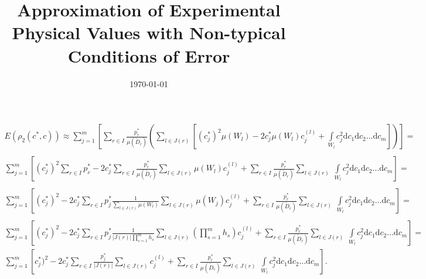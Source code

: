 \documentclass[a4paper]{article}
\title{Approximation of Experimental Physical Values with Non-typical Conditions of Error}
\date{\today}
\numberwithin{equation}{subsection}
\begin{document}
\begin{gather}
\nonumber
E(\rho_{2}(c^{*},c)) \approx \sum\limits_{j=1}^{m}  \left[ \sum\limits_{r \in I} \frac{p_{r}^{*}}{\mu(\tilde{D}_{r})} \left( \sum\limits_{l \in J(r)} \left[ (c_{j}^{*})^{2} \mu(W_{l}) - 2c_{j}^{*} \mu(W_{l}) c_{j}^{(l)} + \int\limits_{W_{l}} c_{j}^{2} \mathrm{d}c_{1} \mathrm{d}c_{2} \dots \mathrm{d}c_{m} \right] \right) \right] = \\
\nonumber
\\
\nonumber
\sum\limits_{j=1}^{m} \left[  (c_{j}^{*})^{2}  \sum\limits_{r \in I} p_{r}^{*}  - 2c_{j}^{*}  \sum\limits_{r \in I} \frac{p_{r}^{*}}{\mu(\tilde{D}_{r})} \sum\limits_{l \in J(r)} \mu(W_{l})  c_{j}^{(l)}  + \sum\limits_{r \in I} \frac{p_{r}^{*}}{\mu(\tilde{D}_{r})} \sum\limits_{l \in J(r)} \ \int\limits_{W_{l}} c_{j}^{2}  \mathrm{d}c_{1} \mathrm{d}c_{2} \dots \mathrm{d}c_{m} \right] = \\
\nonumber
\\
\nonumber
\sum\limits_{j=1}^{m} \left[  (c_{j}^{*})^{2} - 2c_{j}^{*} \sum\limits_{r \in I} p_{j}^{*} \frac{1}{\sum\limits_{l \in J(r)} \mu(W_{l})} \sum\limits_{l \in J(r)} \mu(W_{j}) c_{j}^{(l)} +  \sum\limits_{r \in I} \frac{p_{r}^{*}}{\mu(\tilde{D}_{r})} \sum\limits_{l \in J(r)} \ \int\limits_{W_{l}} c_{j}^{2}  \mathrm{d}c_{1} \mathrm{d}c_{2} \dots \mathrm{d}c_{m} \right] = \\
\nonumber
\\
\nonumber
\sum\limits_{j=1}^{m}  \left[    (c_{j}^{*})^{2} - 2c_{j}^{*} \sum\limits_{r \in I} p_{j}^{*} \frac{1}{\left| J(r) \right| \prod\limits_{s=1}^{m} h_{s}} \sum\limits_{l \in J(r)} \left( \prod_{s=1}^{m} h_{s} \right) c_{j}^{(l)} +  \sum\limits_{r \in I} \frac{p_{r}^{*}}{\mu(\tilde{D}_{r})} \sum\limits_{l \in J(r)} \ \int\limits_{W_{l}} c_{j}^{2}  \mathrm{d}c_{1} \mathrm{d}c_{2} \dots \mathrm{d}c_{m} \right] = \\
\sum\limits_{j=1}^{m} \left[ c_{j}^{*})^{2} - 2c_{j}^{*} \sum\limits_{r \in I} \frac{p_{j}^{*}}{ \left| J(r) \right|} \sum\limits_{l \in J(r)} c_{j}^{(l)} + \sum\limits_{r \in I} \frac{p_{r}^{*}}{\mu(\tilde{D}_{r})} \sum\limits_{l \in J(r)} \ \int\limits_{W_{l}} c_{j}^{2}  \mathrm{d}c_{1} \mathrm{d}c_{2} \dots \mathrm{d}c_{m} \right]. \label{eq-final-simplification}
\end{gather}
\end{document}
